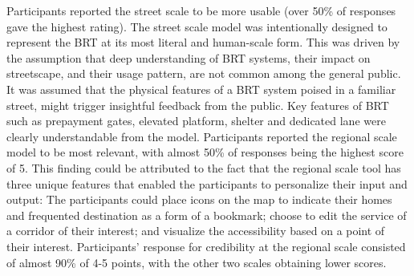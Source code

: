{{{            Participants reported the street scale to be more usable (over 50\% of responses gave the highest rating). The street scale model was intentionally designed to represent the BRT at its most literal and human-scale form. This was driven by the assumption that deep understanding of BRT systems, their impact on streetscape, and their usage pattern, are not common among the general public. It was assumed that the physical features of a BRT system poised in a familiar street, might trigger insightful feedback from the public. Key features of BRT such as prepayment gates, elevated platform, shelter and dedicated lane were clearly understandable from the model.
            \newline
            Participants reported the regional scale model to be most relevant, with almost 50\% of responses being the highest score of 5. This finding could be attributed to the fact that the regional scale tool has three unique features that enabled the participants to personalize their input and output: The participants could place icons on the map to indicate their homes and frequented destination as a form of a bookmark; choose to edit the service of a corridor of their interest; and visualize the accessibility based on a point of their interest. Participants' response for credibility at the regional scale consisted of almost 90\% of 4-5 points, with the other two scales obtaining lower scores.
        }

}}
